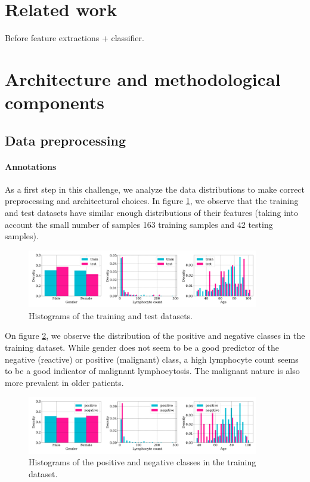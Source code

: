 \documentclass{midl}
\begin{document}
\section{Related work}
\label{sec:introduction}

Before feature extractions + classifier.


\section{Architecture and methodological components}
\label{sec:methodology}

\subsection{Data preprocessing}

\paragraph*{Annotations}
As a first step in this challenge, we analyze the data distributions to make correct preprocessing and architectural choices. In figure \ref{fig:train_test_histograms}, we observe that the training and test datasets have similar enough distributions of their features (taking into account the small number of samples 163 training samples and 42 testing samples).

\begin{figure}[h]
    \centering
    \includegraphics[width=0.9\textwidth]{figures/train_test_histograms.png}
    \caption{Histograms of the training and test datasets.}
    \label{fig:train_test_histograms}
\end{figure}

On figure \ref{fig:positive_negative_histograms}, we observe the distribution of the positive and negative classes in the training dataset. While gender does not seem to be a good predictor of the negative (reactive) or positive (malignant) class, a high lymphocyte count seems to be a good indicator of malignant lymphocytosis. The malignant nature is also more prevalent in older patients.

\begin{figure}[h]
    \centering
    \includegraphics[width=0.9\textwidth]{figures/positive_negative_histograms.png}
    \caption{Histograms of the positive and negative classes in the training dataset.}
    \label{fig:positive_negative_histograms}
\end{figure}
\end{document}
